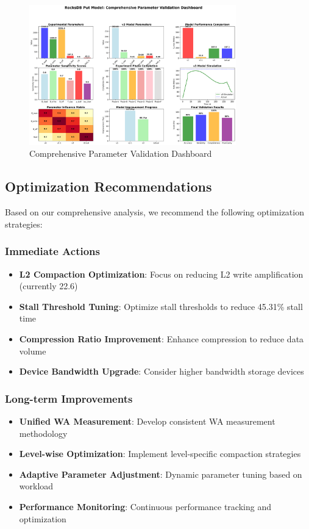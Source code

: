 \documentclass[11pt,twocolumn]{article}
\begin{document}
\begin{figure}[H]
\centering
\includegraphics[width=0.8\textwidth]{experiments/2025-09-05/comprehensive_parameter_validation_dashboard.png}
\caption{Comprehensive Parameter Validation Dashboard}
\label{fig:parameter_dashboard}
\end{figure}

\subsection{Optimization Recommendations}

Based on our comprehensive analysis, we recommend the following optimization strategies:

\subsubsection{Immediate Actions}
\begin{itemize}
    \item \textbf{L2 Compaction Optimization}: Focus on reducing L2 write amplification (currently 22.6)
    \item \textbf{Stall Threshold Tuning}: Optimize stall thresholds to reduce 45.31\% stall time
    \item \textbf{Compression Ratio Improvement}: Enhance compression to reduce data volume
    \item \textbf{Device Bandwidth Upgrade}: Consider higher bandwidth storage devices
\end{itemize}

\subsubsection{Long-term Improvements}
\begin{itemize}
    \item \textbf{Unified WA Measurement}: Develop consistent WA measurement methodology
    \item \textbf{Level-wise Optimization}: Implement level-specific compaction strategies
    \item \textbf{Adaptive Parameter Adjustment}: Dynamic parameter tuning based on workload
    \item \textbf{Performance Monitoring}: Continuous performance tracking and optimization
\end{itemize}
\end{document}

